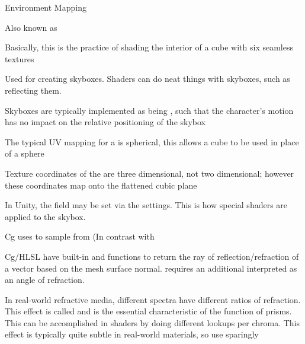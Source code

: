 \documentclass[11pt]{article}
\begin{document}
\maketitle

\begin{topic}{Environment Mapping}
	\item Also known as 
	\item Basically, this is the practice of shading the interior of a cube with six seamless textures
	\item Used for creating skyboxes. Shaders can do neat things with skyboxes, such as reflecting them.
	\item Skyboxes are typically implemented as being , such that the character's motion has no impact on the relative positioning of the skybox
	\item The typical UV mapping for a  is spherical, this allows a cube to be used in place of a sphere
	\item Texture coordinates of the  are three dimensional, not two dimensional; however these coordinates map onto the flattened cubic plane
	\item In Unity, the  field may be set via the  settings. This is how special shaders are applied to the skybox.
	\item Cg uses  to sample from  (In contrast with 
	\item Cg/HLSL have built-in  and  functions to return the ray of reflection/refraction of a vector based on the mesh surface normal.  requires an additional  interpreted as an angle of refraction.
	\item In real-world refractive media, different spectra have different ratios of refraction. This effect is called  and is the essential characteristic of the function of prisms. This can be accomplished in shaders by doing different  lookups per chroma. This effect is typically quite subtle in real-world materials, so use sparingly
\end{topic}
\end{document}
